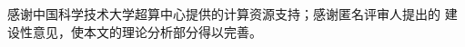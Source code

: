 \begin{acknowledgements}
感谢中国科学技术大学超算中心提供的计算资源支持；感谢匿名评审人提出的
建设性意见，使本文的理论分析部分得以完善。
\end{acknowledgements}
